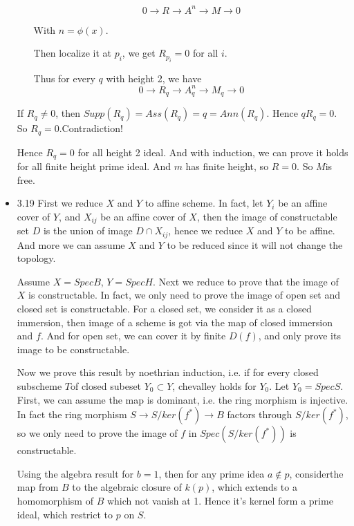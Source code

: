 \documentclass[10pt,letterpaper]{article}
\theoremstyle{plain}
\theoremstyle{definition}
\theoremstyle{remark}
\begin{document}
\begin{itemize}
\begin{enumerate}
  \begin{displaymath}
    0\to R \to A^{n} \to M \to 0
  \end{displaymath}

With $n=\phi(x)$.

Then localize it at $p_{i}$, we get $R_{p_{i}}=0$ for all $i$. 

Thus for every $q$ with height 2, we have 
\begin{displaymath}
    0\to R_{q} \to A^{n}_{q} \to M_{q} \to 0
  \end{displaymath}
\end{enumerate}

If $R_{q} \neq 0$, then $Supp(R_{q})=Ass(R_{q})=q=Ann(R_{q})$. Hence $qR_{q}=0$. So $R_{q}=0$.Contradiction!

Hence $R_{q}=0$ for all height 2 ideal. And with induction, we can prove it holds for all finite height prime ideal. And $m$ has finite height, so $R=0$. So $M$is free.
\item 3.19
First we reduce $X$ and $Y$ to affine scheme. In fact, let $Y_{i}$ be an affine cover of $Y$, and $X_{ij}$ be an affine cover of $X$, then the image of constructable set $D$ is the union of image $D\cap X_{ij}$, hence we reduce $X$ and $Y$ to be affine. And more we can assume $X$ and $Y$ to be reduced since it will not change the topology.

Assume $X=Spec B$, $Y=Spec H$. Next we reduce to prove that the image of $X$ is constructable. In fact, we only need to prove the image of open set and closed set is constructable. For a closed set, we consider it as a closed immersion, then image of a scheme is got via the map of closed immersion and $f$. And for open set, we can cover it by finite $D(f)$, and only prove  its image to be constructable. 


Now we prove this result by noethrian induction, i.e. if for every closed subscheme $T $of closed subeset $Y_{0}\subset Y$, chevalley holds for $Y_{0}$.
Let $Y_{0}=Spec S$. First, we can assume the map is dominant, i.e. the ring morphism is injective. In fact the ring morphism $S \to S/ker(f^{*}) \to B$ factors through $S/ker(f^{*})$, so we only need to prove the image of $f$ in $Spec(S/ker(f^{*}))$ is constructable.

Using the algebra result for $b=1$, then for any prime idea $a \notin p$, considerthe map from $B$ to the algebraic closure of $k(p)$, which extends to a homomorphism of $B$ which not vanish at 1. Hence it's kernel form a prime ideal, which restrict to $p$ on $S$.


\end{itemize}
\end{document}
